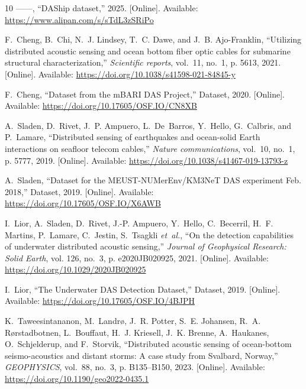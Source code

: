 \documentclass[11pt]{article}
\begin{document}
\begin{thebibliography}{10}
\BIBentryALTinterwordspacing
------, ``{DAShip dataset},'' 2025. [Online]. Available:
  \url{https://www.alipan.com/s/sTdL3zSRiPo}
\BIBentrySTDinterwordspacing

\BIBentryALTinterwordspacing
F.~Cheng, B.~Chi, N.~J. Lindsey, T.~C. Dawe, and J.~B. Ajo-Franklin,
  ``{Utilizing distributed acoustic sensing and ocean bottom fiber optic cables
  for submarine structural characterization},'' \emph{Scientific reports},
  vol.~11, no.~1, p. 5613, 2021. [Online]. Available:
  \url{https://doi.org/10.1038/s41598-021-84845-y}
\BIBentrySTDinterwordspacing

\BIBentryALTinterwordspacing
F.~Cheng, ``{Dataset from the mBARI DAS Project},'' Dataset, 2020. [Online].
  Available: \url{https://doi.org/10.17605/OSF.IO/CN8XB}
\BIBentrySTDinterwordspacing

\BIBentryALTinterwordspacing
A.~Sladen, D.~Rivet, J.~P. Ampuero, L.~De~Barros, Y.~Hello, G.~Calbris, and
  P.~Lamare, ``{Distributed sensing of earthquakes and ocean-solid Earth
  interactions on seafloor telecom cables},'' \emph{Nature communications},
  vol.~10, no.~1, p. 5777, 2019. [Online]. Available:
  \url{https://doi.org/10.1038/s41467-019-13793-z}
\BIBentrySTDinterwordspacing

\BIBentryALTinterwordspacing
A.~Sladen, ``{Dataset for the MEUST-NUMerEnv/KM3NeT DAS experiment Feb.
  2018},'' Dataset, 2019. [Online]. Available:
  \url{https://doi.org/10.17605/OSF.IO/X6AWB}
\BIBentrySTDinterwordspacing

\BIBentryALTinterwordspacing
I.~Lior, A.~Sladen, D.~Rivet, J.-P. Ampuero, Y.~Hello, C.~Becerril, H.~F.
  Martins, P.~Lamare, C.~Jestin, S.~Tsagkli \emph{et~al.}, ``On the detection
  capabilities of underwater distributed acoustic sensing,'' \emph{Journal of
  Geophysical Research: Solid Earth}, vol. 126, no.~3, p. e2020JB020925, 2021.
  [Online]. Available: \url{https://doi.org/10.1029/2020JB020925}
\BIBentrySTDinterwordspacing

\BIBentryALTinterwordspacing
I.~Lior, ``{The Underwater DAS Detection Dataset},'' Dataset, 2019. [Online].
  Available: \url{https://doi.org/10.17605/OSF.IO/4BJPH}
\BIBentrySTDinterwordspacing

\BIBentryALTinterwordspacing
K.~Taweesintananon, M.~Landrø, J.~R. Potter, S.~E. Johansen, R.~A.
  Rørstadbotnen, L.~Bouffaut, H.~J. Kriesell, J.~K. Brenne, A.~Haukanes,
  O.~Schjelderup, and F.~Storvik, ``{Distributed acoustic sensing of
  ocean-bottom seismo-acoustics and distant storms: A case study from Svalbard,
  Norway},'' \emph{GEOPHYSICS}, vol.~88, no.~3, p. B135–B150, 2023. [Online].
  Available: \url{https://doi.org/10.1190/geo2022-0435.1}
\BIBentrySTDinterwordspacing


\end{thebibliography}
\end{document}
